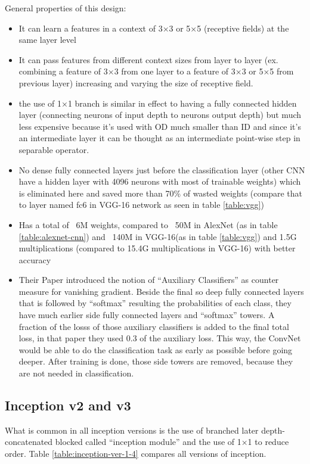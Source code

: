 General properties of this design:
\begin{itemize}
\item It can learn a features in a context of 3×3 or 5×5 (receptive fields) at the same layer level
\item It can pass features from different context sizes from layer to layer
(ex. combining a feature of 3×3 from one layer to a feature of 3×3 or 5×5 from previous layer)
increasing and varying the size of receptive field.
\item the use of 1×1 branch is similar in effect to having a fully connected hidden layer
(connecting neurons of input depth to neurons output depth)
but much less expensive because it's used with OD much smaller than ID and since it's an intermediate layer
it can be thought as an intermediate point-wise step in separable operator.
\item No dense fully connected layers just before the classification layer
(other CNN have a hidden layer with 4096 neurons with most of trainable weights)
which is eliminated here and saved more than 70\% of wasted weights (compare that to layer named fc6 in VGG-16 network as seen in table \ref{table:vgg})
\item Has a total of ~6M weights, compared to ~50M in AlexNet (as in table \ref{table:alexnet-cnn}) and ~140M in VGG-16(as in table \ref{table:vgg}) and 1.5G multiplications (compared to 15.4G multiplications in VGG-16) with better accuracy 
\item Their Paper\autocite{szegedy2015going} introduced the notion of ``Auxiliary Classifiers'' as counter measure for vanishing gradient.
Beside the final so deep fully connected layers that is followed by ``softmax'' resulting the probabilities of each class,
they have much earlier side fully connected layers and ``softmax'' towers.
A fraction of the losss of those auxiliary classifiers is added to the final total loss,
in that paper they used 0.3 of the auxiliary loss.
This way, the ConvNet would be able to do the classification task as early as possible before going deeper.
After training is done, those side towers are removed, because they are not needed in classification.
\end{itemize}

\subsection{Inception v2 and v3}

What is common in all inception versions\autocite{szegedy2016rethinking}\autocite{ioffe2015batch}\autocite{chollet2016xception}\autocite{krause2016unreasonable}
is the use of branched later depth-concatenated blocked called ``inception module''
and the use of 1×1 to reduce order. Table \ref{table:inception-ver-1-4} compares all versions of inception.

